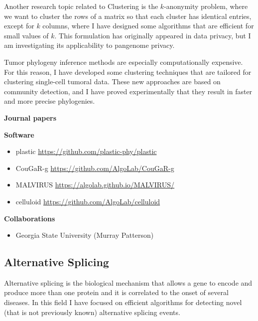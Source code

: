 \documentclass[11pt,a4paper,roman]{moderncv}
\begin{document}
Another research topic related to Clustering is the \(k\)-anonymity problem,
where we want to cluster the rows of a matrix so that each cluster has identical
entries, except for \(k\) columns, where I have designed some algorithms that
are efficient for small values of \(k\).
This formulation has originally appeared in data privacy, but I am investigating
its applicability to pangenome privacy.


Tumor phylogeny inference methods are especially computationally expensive.
For this reason, I have developed some clustering techniques that are tailored
for clustering single-cell tumoral data.
These new approaches are based on community detection, and I have proved
experimentally that they result in faster and more precise phylogenies.


\textbf{Journal papers}

\cite{chourasiaReads2VecEfficientEmbedding2023}
\cite{10.1093/gigascience/giac119}
\cite{DBLP:journals/titb/CiccolellaPBV21}
\cite{DBLP:journals/jco/BonizzoniVDP13}
\cite{DBLP:journals/tcs/BonizzoniVD12}
\cite{DBLP:journals/jco/BonizzoniVD11}
\cite{DBLP:journals/algorithmica/BonizzoniVDM10}
\cite{DBLP:journals/jcss/BonizzoniVDJ08}

\textbf{Software}

\begin{itemize}
\item
      plastic \url{https://github.com/plastic-phy/plastic}
\item
      CouGaR-g \url{https://github.com/AlgoLab/CouGaR-g}
\item
      MALVIRUS \url{https://algolab.github.io/MALVIRUS/}
\item
      celluloid \url{https://github.com/AlgoLab/celluloid}
\end{itemize}

\textbf{Collaborations}

\begin{itemize}
      \item
      Georgia State University (Murray Patterson)
\end{itemize}

\subsection{Alternative Splicing}\label{splicing}

Alternative splicing is the biological mechanism that allows a gene to encode
and produce more than one protein and it is correlated to the onset of several diseases.
In this field I have focused on efficient algorithms for detecting novel (that
is not previously known) alternative splicing events.
\end{document}
